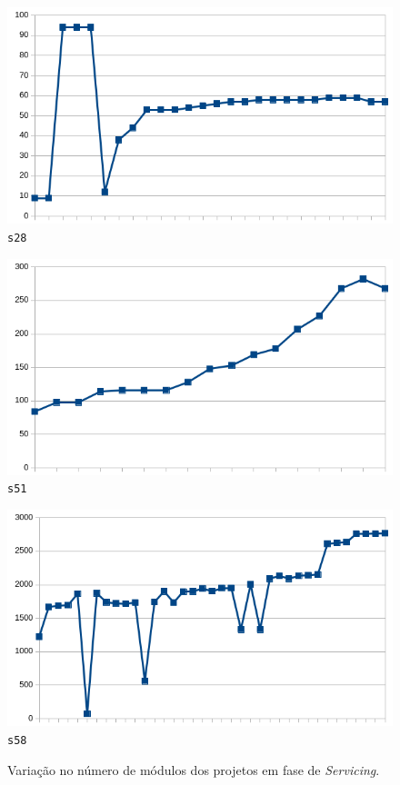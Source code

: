 \begin{figure}[h]
\vspace{3mm}

  \begin{minipage}{0.32\textwidth}
    \centering
    \includegraphics[scale=0.32]{imagens/evolution-s28.png}
    \texttt{s28}
  \end{minipage}
  \begin{minipage}{0.32\textwidth}
    \centering
    \includegraphics[scale=0.32]{imagens/evolution-s51.png}
    \texttt{s51}
  \end{minipage}
  \begin{minipage}{0.32\textwidth}
    \centering
    \includegraphics[scale=0.32]{imagens/evolution-s58.png}
    \texttt{s58}
  \end{minipage}
  \caption{Variação no número de módulos dos projetos em fase de {\it Servicing}.}
  \label{evolution-graph}
\end{figure}

